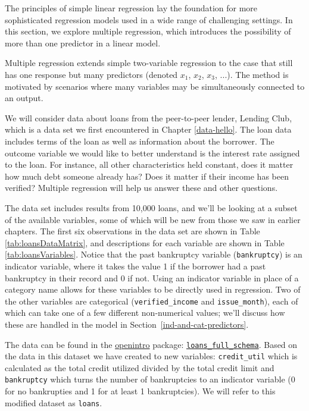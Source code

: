 \documentclass[
  10pt,
  openany]{book}
\theoremstyle{definition}
\theoremstyle{definition}
\theoremstyle{definition}
\theoremstyle{definition}
\theoremstyle{remark}
\begin{document}
The principles of simple linear regression lay the foundation for more sophisticated regression models used in a wide range of challenging settings.
In this section, we explore multiple regression, which introduces the possibility of more than one predictor in a linear model.

Multiple regression extends simple two-variable regression to the case that still has one response but many predictors (denoted \(x_1\), \(x_2\), \(x_3\), ...). The method is motivated by scenarios where many variables may be simultaneously connected to an output.

We will consider data about loans from the peer-to-peer lender, Lending Club, which is a data set we first encountered in Chapter \ref{data-hello}.
The loan data includes terms of the loan as well as information about the borrower.
The outcome variable we would like to better understand is the interest rate assigned to the loan.
For instance, all other characteristics held constant, does it matter how much debt someone already has? Does it matter if their income has been verified?
Multiple regression will help us answer these and other questions.

The data set includes results from 10,000 loans, and we'll be looking at a subset of the available variables, some of which will be new from those we saw in earlier chapters.
The first six observations in the data set are shown in Table \ref{tab:loansDataMatrix}, and descriptions for each variable are shown in Table \ref{tab:loansVariables}.
Notice that the past bankruptcy variable (\texttt{bankruptcy}) is an indicator variable, where it takes the value 1 if the borrower had a past bankruptcy in their record and 0 if not.
Using an indicator variable in place of a category name allows for these variables to be
directly used in regression.
Two of the other variables are categorical (\texttt{verified\_income} and \texttt{issue\_month}), each of which can take one of a few different non-numerical values; we'll discuss how these are handled in the model in Section~\ref{ind-and-cat-predictors}.

The data can be found in the \href{http://openintrostat.github.io/openintro}{openintro} package: \href{http://openintrostat.github.io/openintro/reference/loans_full_schema.html}{\texttt{loans\_full\_schema}}. Based on the data in this dataset we have created to new variables: \texttt{credit\_util} which is calculated as the total credit utilized divided by the total credit limit and \texttt{bankruptcy} which turns the number of bankruptcies to an indicator variable (0 for no bankrupties and 1 for at least 1 bankruptcies). We will refer to this modified dataset as \texttt{loans}.
\end{document}
